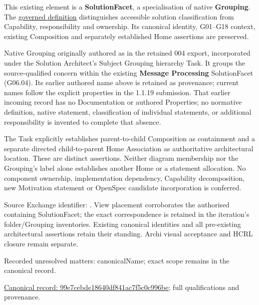 This existing element is a \textbf{SolutionFacet}, a specialisation of native
\textbf{Grouping}. The \href{\detokenize{../../../../../../../governance/continuum-representation.md#solutionfacet-classification--1119-candidate}}{governed definition}
distinguishes accessible solution classification from Capability, responsibility
and ownership. Its canonical identity, G01–G18 context, existing Composition
and separately established Home assertions are preserved.



Native Grouping originally authored as \texttt{} in the retained 004 export,
incorporated under the Solution Architect's Subject Grouping hierarchy Task.
It groups the source-qualified \texttt{} concern within
the existing \textbf{Message Processing} SolutionFacet (G06.04). Its earlier authored name above is retained as provenance; current names
follow the explicit properties in the 1.1.19 submission.
That earlier incoming record has no Documentation or authored Properties; no normative
definition, native statement, classification of individual statements, or
additional responsibility is invented to complete that absence.



The Task explicitly establishes parent-to-child Composition as containment and
a separate directed child-to-parent Home Association as authoritative architectural
location. These are distinct assertions. Neither diagram membership nor the
Grouping's label alone establishes another Home or a statement allocation.
No component ownership, implementation dependency, Capability decomposition,
new Motivation statement or OpenSpec candidate incorporation is conferred.



Source Exchange identifier: \texttt{}. View placement corroborates
the authorised containing SolutionFacet; the exact correspondence is retained in the
iteration's folder/Grouping inventories. Existing canonical identities and all
pre-existing architectural assertions retain their standing. Archi visual
acceptance and HCRL closure remain separate.


{\small Recorded unresolved matters: canonicalName; exact scope remains in the canonical record.}\par
{\footnotesize \href{../../../../../../../continuum/grouping/99e7cebde18640df841ac7f5c0c996be.md}{Canonical record: 99e7cebde18640df841ac7f5c0c996be}; full qualifications and provenance.}\par
